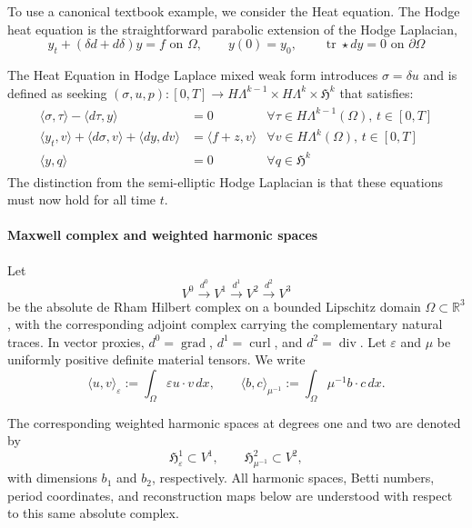 \documentclass{article}
\DeclareMathOperator{\grad}{grad}
\DeclareMathOperator{\curl}{curl}
\DeclareMathOperator{\divergence}{div}
\newcommand{\f}[1]{\mathfrak{#1}}
\newcommand{\R} {\mathbb R}
\newcommand{\HH}{\mathfrak H}
\newcommand{\ip}[2]{\langle #1,#2\rangle}
\begin{document}
To use a canonical textbook example, we consider the Heat equation. The Hodge heat equation is the straightforward parabolic extension of the Hodge Laplacian,
\[
y_t+(\delta d+d \delta)y = f\text{ on }\Omega,\qquad y(0)=y_0,\qquad \mathop{tr}\star dy=0\text{ on }\partial\Omega
\]

The Heat Equation in Hodge Laplace mixed weak form introduces $\sigma=\delta u$ and is defined as seeking $(\sigma,u,p):[0,T]\to H\Lambda^{k-1}\times H\Lambda^k\times \f H^k$ that satisfies: 
\begin{align}
	\begin{array}{rll}
		\langle \sigma, \tau \rangle - \langle d\tau, y \rangle
		 & = 0
		 & \forall \tau \in H\Lambda^{k-1}(\Omega),\, t\in[0,T]
		\\
		\langle y_t , v \rangle + \langle d\sigma, v \rangle+\langle dy,dv\rangle
		 & = \langle f+z, v\rangle
		 & \forall v \in H\Lambda^k(\Omega),\,t\in[0,T]
		\\
		\langle y, q \rangle
		 & = 0
		 & \forall q \in \mathfrak H^k
	\end{array}
\end{align}
The distinction from the semi-elliptic Hodge Laplacian is that these equations must now hold for all time $t$.

\paragraph{Maxwell complex and weighted harmonic spaces}

Let
\[
  V^0 \xrightarrow{d^0} V^1 \xrightarrow{d^1} V^2
  \xrightarrow{d^2} V^3
\]
be the absolute de Rham Hilbert complex on a bounded Lipschitz domain
$\Omega\subset\R^3$, with the corresponding adjoint complex carrying
the complementary natural traces. In vector proxies,
$d^0=\grad$, $d^1=\curl$, and $d^2=\divergence$.
Let $\varepsilon$ and $\mu$ be uniformly positive definite material
tensors. We write
\[
  \ip{u}{v}_{\varepsilon}
  :=\int_\Omega \varepsilon u\cdot v\,dx,
  \qquad
  \ip{b}{c}_{\mu^{-1}}
  :=\int_\Omega \mu^{-1}b\cdot c\,dx.
\]

The corresponding weighted harmonic spaces at degrees one and two are
denoted by
\[
  \HH^1_{\varepsilon}\subset V^1,
  \qquad
  \HH^2_{\mu^{-1}}\subset V^2,
\]
with dimensions $b_1$ and $b_2$, respectively. All harmonic spaces,
Betti numbers, period coordinates, and reconstruction maps below are
understood with respect to this same absolute complex.
\end{document}
